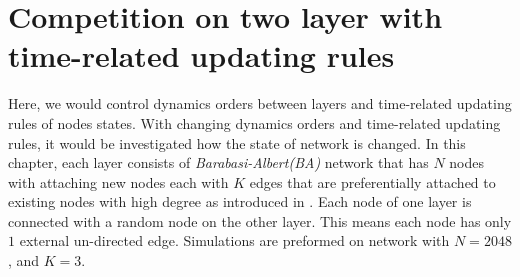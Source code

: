 
\chapter{Competition on two layer with time-related updating rules}
\label{chap:competition on two layer with different updating rules}
Here, we would control dynamics orders between layers and time-related updating rules of nodes states. With changing dynamics orders and time-related updating rules, it would be investigated how the state of network is changed.
In this chapter, each layer consists of \textit{Barabasi-Albert(BA)} network that has $N$ nodes with attaching new nodes each with $K$ edges that are preferentially attached to existing nodes with high degree as introduced in \parencite{barabasi1999}. Each node of one layer is connected with a random node on the other layer. This means each node has only $1$ external un-directed edge. Simulations are preformed on network with $N=2048$, and $K = 3$.

